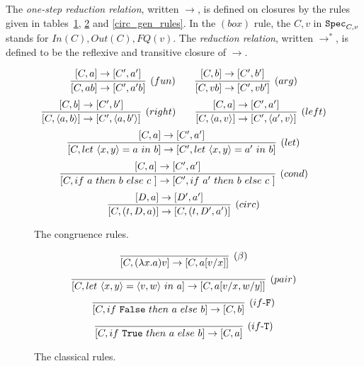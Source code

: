 \documentclass{article}
\begin{document}

\begin{definition}
The \emph{one-step reduction relation}, written $\to$, is defined 
on closures by the rules given in tables~\hyperref[cong_rules]{\ref*{cong_rules}}, 
\hyperref[classical_rules]{\ref*{classical_rules}} 
and \hyperref[circ_gen_rules]{\ref*{circ_gen_rules}}. 
In the $(box)$ rule, the $C,v$ in $\texttt{Spec}_{C,v}$ stands for $In(C),Out(C),FQ(v)$.
The \emph{reduction relation}, 
written $\to^*$, is defined to be the reflexive and transitive closure of $\to$.
\end{definition}

\begin{figure}[!ht]
\begin{mdframed}
\[
  \infer[(fun)]{[C,ab]\to[C',a'b]}{
    [C,a]\to[C',a']
  }
~~~~~~
  \infer[(arg)]{[C,vb]\to [C',vb']}{
    [C,b]\to [C',b']
  }
\]
\[
  \infer[(right)]{[C,\langle a,b\rangle]\to [C',\langle a,b'\rangle]}{
    [C,b]\to [C',b']
  }
~~~~~~
  \infer[(left)]{[C,\langle a,v\rangle]\to [C',\langle a',v\rangle]}{
    [C,a]\to [C',a']
  }
\]
\[
  \infer[(let)]{[C,let ~ \langle x,y \rangle = a ~in~ b]\to 
                [C', let ~ \langle x,y \rangle = a' ~in~ b]}{
    [C,a]\to [C',a']
  }
\]
\[
  \infer[(cond)]{[C, if ~a~ then ~b~ else ~c~]\to [C', if ~a'~ then ~b~ else ~c~]}{
    [C,a]\to [C',a']
  }
\]
\[
  \infer[(circ)]{[C, (t,D,a)]\to [C, (t,D',a')]}{
    [D,a]\to [D',a']
  }
\]
\end{mdframed}
\caption{The congruence rules.}
\label{cong_rules}
\end{figure}

\begin{figure}[!ht]
\begin{mdframed}
\[
  \infer[(\beta)]{[C,(\lambda x.a)v]\to [C, a[v/x]]}{}
\]
\[
  \infer[(pair)]{[C,let ~\atuple{x,y}=\atuple{v,w}~ in ~a]\to[C,a[v/x,w/y]]}{}
\]
\[
  \infer[(if\mbox{-}\mathtt{F})]{[C,if ~\mathtt{False}~ then ~a~ else ~b] \to [C, b]}{}
\]
\[
  \infer[(if\mbox{-}\mathtt{T})]{[C,if ~\mathtt{True}~ then ~a~ else ~b] \to [C, a]}{}
\]
\end{mdframed}
\caption{The classical rules.}
\label{classical_rules}
\end{figure}
\end{document}
